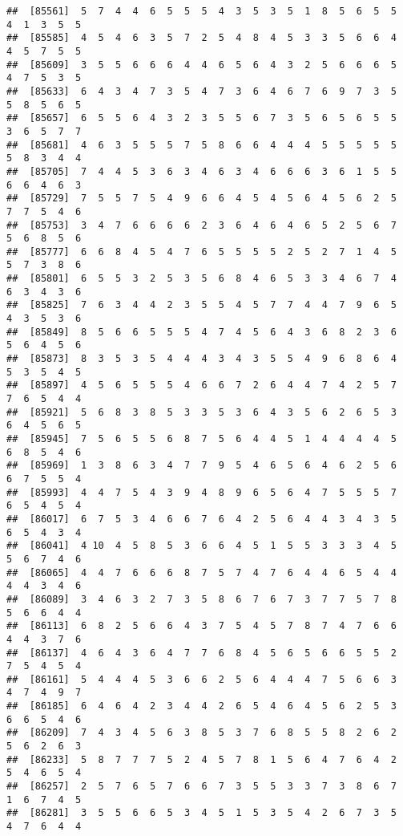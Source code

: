 \documentclass[
]{book}
\begin{document}
\begin{verbatim}
##  [85561]  5  7  4  4  6  5  5  5  4  3  5  3  5  1  8  5  6  5  5  4  1  3  5  5
##  [85585]  4  5  4  6  3  5  7  2  5  4  8  4  5  3  3  5  6  6  4  4  5  7  5  5
##  [85609]  3  5  5  6  6  6  4  4  6  5  6  4  3  2  5  6  6  6  5  4  7  5  3  5
##  [85633]  6  4  3  4  7  3  5  4  7  3  6  4  6  7  6  9  7  3  5  5  8  5  6  5
##  [85657]  6  5  5  6  4  3  2  3  5  5  6  7  3  5  6  5  6  5  5  3  6  5  7  7
##  [85681]  4  6  3  5  5  5  7  5  8  6  6  4  4  4  5  5  5  5  5  5  8  3  4  4
##  [85705]  7  4  4  5  3  6  3  4  6  3  4  6  6  6  3  6  1  5  5  6  6  4  6  3
##  [85729]  7  5  5  7  5  4  9  6  6  4  5  4  5  6  4  5  6  2  5  7  7  5  4  6
##  [85753]  3  4  7  6  6  6  6  2  3  6  4  6  4  6  5  2  5  6  7  5  6  8  5  6
##  [85777]  6  6  8  4  5  4  7  6  5  5  5  5  2  5  2  7  1  4  5  5  7  3  8  6
##  [85801]  6  5  5  3  2  5  3  5  6  8  4  6  5  3  3  4  6  7  4  6  3  4  3  6
##  [85825]  7  6  3  4  4  2  3  5  5  4  5  7  7  4  4  7  9  6  5  4  3  5  3  6
##  [85849]  8  5  6  6  5  5  5  4  7  4  5  6  4  3  6  8  2  3  6  5  6  4  5  6
##  [85873]  8  3  5  3  5  4  4  4  3  4  3  5  5  4  9  6  8  6  4  5  3  5  4  5
##  [85897]  4  5  6  5  5  5  4  6  6  7  2  6  4  4  7  4  2  5  7  7  6  5  4  4
##  [85921]  5  6  8  3  8  5  3  3  5  3  6  4  3  5  6  2  6  5  3  6  4  5  6  5
##  [85945]  7  5  6  5  5  6  8  7  5  6  4  4  5  1  4  4  4  4  5  6  8  5  4  6
##  [85969]  1  3  8  6  3  4  7  7  9  5  4  6  5  6  4  6  2  5  6  6  7  5  5  4
##  [85993]  4  4  7  5  4  3  9  4  8  9  6  5  6  4  7  5  5  5  7  6  5  4  5  4
##  [86017]  6  7  5  3  4  6  6  7  6  4  2  5  6  4  4  3  4  3  5  6  5  4  3  4
##  [86041]  4 10  4  5  8  5  3  6  6  4  5  1  5  5  3  3  3  4  5  5  6  7  4  6
##  [86065]  4  4  7  6  6  6  8  7  5  7  4  7  6  4  4  6  5  4  4  4  4  3  4  6
##  [86089]  3  4  6  3  2  7  3  5  8  6  7  6  7  3  7  7  5  7  8  5  6  6  4  4
##  [86113]  6  8  2  5  6  6  4  3  7  5  4  5  7  8  7  4  7  6  6  4  4  3  7  6
##  [86137]  4  6  4  3  6  4  7  7  6  8  4  5  6  5  6  6  5  5  2  7  5  4  5  4
##  [86161]  5  4  4  4  5  3  6  6  2  5  6  4  4  4  7  5  6  6  3  4  7  4  9  7
##  [86185]  6  4  6  4  2  3  4  4  2  6  5  4  6  4  5  6  2  5  3  6  6  5  4  6
##  [86209]  7  4  3  4  5  6  3  8  5  3  7  6  8  5  5  8  2  6  2  5  6  2  6  3
##  [86233]  5  8  7  7  7  5  2  4  5  7  8  1  5  6  4  7  6  4  2  5  4  6  5  4
##  [86257]  2  5  7  6  5  7  6  6  7  3  5  5  3  3  7  3  8  6  7  1  6  7  4  5
##  [86281]  3  5  5  6  6  5  3  4  5  1  5  3  5  4  2  6  7  3  5  4  7  6  4  4

\end{verbatim}
\end{document}
